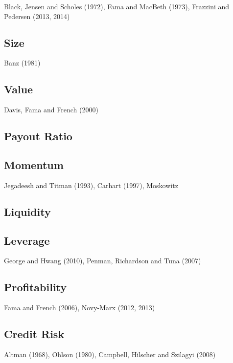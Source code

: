Black, Jensen and Scholes (1972)\cite{black1972capital},
Fama and MacBeth (1973)\cite{fama1973risk},
Frazzini and Pedersen (2013, 2014)\cite{frazzini2014betting}

\subsection{Size}

Banz (1981)\cite{banz1981relationship}

\subsection{Value}

Davis, Fama and French (2000)\cite{davis2000characteristics}

\subsection{Payout Ratio}

\subsection{Momentum}

Jegadeesh and Titman (1993)\cite{jegadeesh1993returns},
Carhart (1997)\cite{carhart1997persistence},
Moskowitz

\subsection{Liquidity}

\subsection{Leverage}

George and Hwang (2010),
Penman, Richardson and Tuna (2007)

\subsection{Profitability}

Fama and French (2006),
Novy-Marx (2012, 2013)

\subsection{Credit Risk}

Altman (1968),
Ohlson (1980),
Campbell, Hilscher and Szilagyi (2008)

